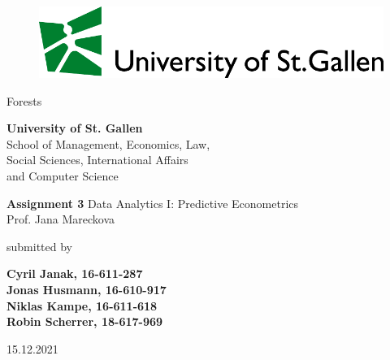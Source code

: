 \begin{center}
\begin{figure}[htb]
  \centering
  \def\svgwidth{450pt}
  \scriptsize{\includegraphics[width=15cm]{rmarkdown/logo-hsg-neu-en.pdf}}
\end{figure}
\end{center}

\medskip
\begin{center}
  \huge{Forests}
\end{center}

\medskip
\begin{center}
  \normalsize{\textbf{University of St. Gallen}\\
              School of Management, Economics, Law,\\
              Social Sciences, International Affairs \\
              and Computer Science}
\end{center}

\medskip
\begin{center}
\textbf{\Large{Assignment 3}}
\linebreak
\linebreak
\normalsize{Data Analytics I: Predictive Econometrics\\
            Prof. Jana Mareckova}
\end{center}
\medskip
\begin{center}
  submitted by
\end{center}
\medskip
\begin{center}
  \Large{\textbf{Cyril Janak, 16-611-287}}\\
  \Large{\textbf{Jonas Husmann, 16-610-917}}\\
  \Large{\textbf{Niklas Kampe, 16-611-618}}\\
  \Large{\textbf{Robin Scherrer, 18-617-969}}
\end{center}

\vspace*{\fill}
\begin{center}
\large{15.12.2021}
\end{center}